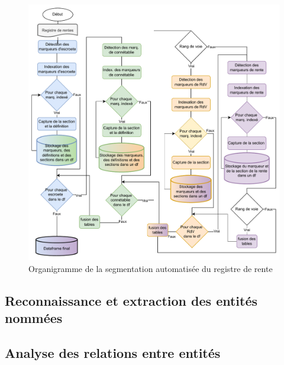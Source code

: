 \begin{figure}[ht] %
    \centering
    \includegraphics[scale=0.75]{2.Methods/Img/seg.drawio.pdf} 
    \caption{Organigramme de la segmentation automatisée du registre de rente }
\end{figure}


\subsection{Reconnaissance et extraction des entités nommées}

\subsection{Analyse des relations entre entités}